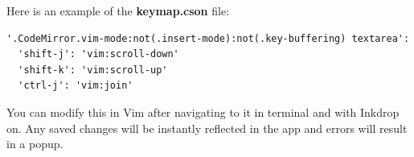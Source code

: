 Here is an example of the \textbf{keymap.cson} file:
\begin{lstlisting}
'.CodeMirror.vim-mode:not(.insert-mode):not(.key-buffering) textarea':
  'shift-j': 'vim:scroll-down'
  'shift-k': 'vim:scroll-up'
  'ctrl-j': 'vim:join'
\end{lstlisting}
You can modify this in Vim after navigating to it in terminal and with Inkdrop
on. Any saved changes will be instantly reflected in the app and errors will
result in a popup.
